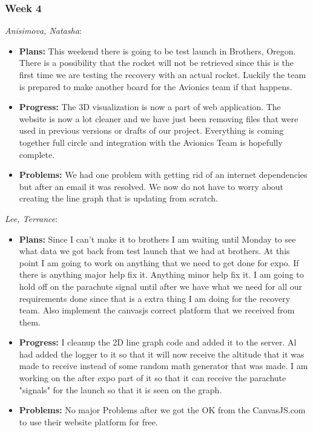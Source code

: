 \documentclass[10pt,draftclsnofoot,onecolumn]{IEEEtran}
\newcommand{\subsubsubsection}[1]{
	\hfill\break\textit{#1}:
}
\begin{document}
\subsubsection{Week 4}
\subsubsubsection{Anisimova, Natasha}
\begin{itemize}
	\item \textbf{Plans: }
	This weekend there is going to be test launch in Brothers, Oregon. There is a possibility that the rocket will not be retrieved since this is the first time we are testing the recovery with an actual rocket. Luckily the team is prepared to make another board for the Avionics team if that happens.
	\item \textbf{Progress:  }
	The 3D visualization is now a part of web application. The website is now a lot cleaner and we have just been removing files that were used in previous versions or drafts of our project. Everything is coming together full circle and integration with the Avionics Team is hopefully complete.
	\item \textbf{Problems: }
	We had one problem with getting rid of an internet dependencies but after an email it was resolved. We now do not have to worry about creating the line graph that is updating from scratch.
\end{itemize}

\subsubsubsection{Lee, Terrance}
\begin{itemize}
	\item \textbf{Plans: }
	Since I can't make it to brothers I am waiting until Monday to see what data we got back from test launch that we had at brothers. At this point I am going to work on anything that we need to get done for expo. If there is anything major help fix it. Anything minor help fix it. I am going to hold off on the parachute signal until after we have what we need for all our requirements done since that is a extra thing I am doing for the recovery team. Also implement the canvasjs correct platform that we received from them.
	\item \textbf{Progress:  }
	I cleanup the 2D line graph code and added it to the server. Al had added the logger to it so that it will now receive the altitude that it was made to receive instead of some random math generator that was made. I am working on the after expo part of it so that it can receive the parachute "signals" for the launch so that it is seen on the graph.
	\item \textbf{Problems: }
	No major Problems after we got the OK from the CanvasJS.com to use their website platform for free.
\end{itemize}
\end{document}
